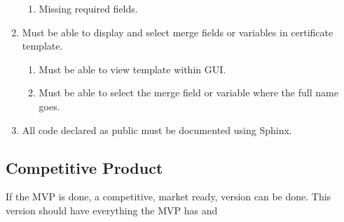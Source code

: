 \documentclass[11pt]{article}
\begin{document}
\begin{enumerate}
\begin{enumerate}
        \item Missing required fields.
    \end{enumerate}
    \item Must be able to display and select merge fields or variables in certificate template.
    \begin{enumerate}
        \item Must be able to view template within GUI.
        \item Must be able to select the merge field or variable where the full name goes.
    \end{enumerate}
    \item All code declared as public must be documented using Sphinx.
\end{enumerate}

\subsection{Competitive Product}

If the MVP is done, a competitive, market ready, version can be done. This version should have everything the MVP has and
\end{document}
